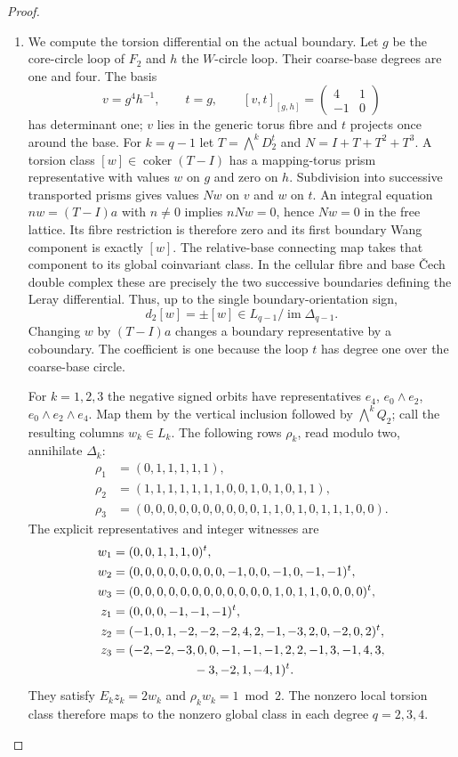 \begin{proof}
\begin{enumerate}[label=\arabic*.]
\item We compute the torsion differential on the actual boundary.
Let $g$ be the core-circle loop of $F_2$ and $h$ the $W$-circle loop.
Their coarse-base degrees are one and four.  The basis
\[
 v=g^4h^{-1},\qquad t=g,
 \qquad [v,t]_{[g,h]}=\begin{pmatrix}4&1\\-1&0\end{pmatrix}
\]
has determinant one; $v$ lies in the generic torus fibre and $t$
projects once around the base.
For $k=q-1$ let $T=\bigwedge^kD_2^t$ and $N=I+T+T^2+T^3$.
A torsion class $[w]\in\operatorname{coker}(T-I)$ has a mapping-torus
prism representative with values $w$ on $g$ and zero on $h$.
Subdivision into successive transported prisms gives values $Nw$
on $v$ and $w$ on $t$.  An integral equation $nw=(T-I)a$ with
$n\ne0$ implies $nNw=0$, hence $Nw=0$ in the free lattice.
Its fibre restriction is therefore zero and its first boundary
Wang component is exactly $[w]$.
The relative-base connecting map takes that component to its global
coinvariant class.  In the cellular fibre and base \v{C}ech double
complex these are precisely the two successive boundaries defining
the Leray differential.  Thus, up to the single boundary-orientation
sign,
\[
 d_2[w]=\pm[w]\in L_{q-1}/\operatorname{im}\Delta_{q-1}.
 \tag{F.6}\label{maps:eq:F.6}
\]
Changing $w$ by $(T-I)a$ changes a boundary representative by a
coboundary.  The coefficient is one because the loop $t$ has degree
one over the coarse-base circle.

For $k=1,2,3$ the negative signed orbits have representatives
$e_4$, $e_0\wedge e_2$, $e_0\wedge e_2\wedge e_4$.
Map them by the vertical inclusion followed by $\bigwedge^kQ_2$;
call the resulting columns $w_k\in L_k$.
The following rows $\rho_k$, read modulo two, annihilate
$\Delta_k$:
\[
\begin{aligned}
\rho_1&=(0,1,1,1,1,1),\\
\rho_2&=(1,1,1,1,1,1,1,0,0,1,0,1,0,1,1),\\
\rho_3&=(0,0,0,0,0,0,0,0,0,0,1,1,0,1,0,1,1,1,0,0).
\end{aligned}
\]
The explicit representatives and integer witnesses are
\[
\begin{aligned}
w_1&=(0,0,1,1,1,0)^t,\\
w_2&=(0,0,0,0,0,0,0,0,-1,0,0,-1,0,-1,-1)^t,\\
w_3&=(0,0,0,0,0,0,0,0,0,0,0,0,1,0,1,1,0,0,0,0)^t,\\
z_1&=(0,0,0,-1,-1,-1)^t,\\
z_2&=(-1,0,1,-2,-2,-2,4,2,-1,-3,2,0,-2,0,2)^t,\\
z_3&=(-2,-2,-3,0,0,-1,-1,-1,2,2,-1,3,-1,4,3,\\
   &\hspace{23mm}-3,-2,1,-4,1)^t.
\end{aligned}
\]
They satisfy $E_kz_k=2w_k$ and $\rho_kw_k=1\bmod2$.
The nonzero local torsion class therefore maps to the nonzero global
class in each degree $q=2,3,4$.


\end{enumerate}
\end{proof}
